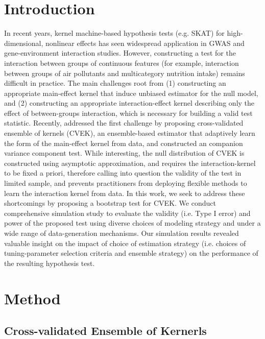 \documentclass[11pt]{article}
\begin{document}
\section{{\bf Introduction}}
In recent years, kernel machine-based hypothesis tests (e.g. SKAT) for high-dimensional, nonlinear effects has seen widespread application in GWAS and gene-environment interaction studies. However, constructing a test for the interaction between groups of continuous features (for example, interaction between groups of air pollutants and multicategory nutrition intake) remains difficult in practice. The main challenges root from (1) constructing an appropriate main-effect kernel that induce unbiased estimator for the null model, and (2) constructing an appropriate interaction-effect kernel describing only the effect of between-groups interaction, which is necessary for building a valid test statistic. Recently, \citep{liu_robust_2017} addressed the first challenge by proposing cross-validated ensemble of kernels (CVEK), an ensemble-based estimator that adaptively learn the form of the main-effect kernel from data, and constructed an companion variance component test. While interesting, the null distribution of CVEK is constructed using asymptotic approximation, and requires the interaction-kernel to be fixed a priori, therefore calling into question the validity of the test in limited sample, and prevents practitioners from deploying flexible methods to learn the interaction kernel from data. In this work, we seek to address these shortcomings by proposing a bootstrap test for CVEK. We conduct comprehensive simulation study to evaluate the validity (i.e. Type I error) and power of the proposed test using diverse choices of modeling strategy and under a wide range of data-generation mechanisms. Our simulation results revealed valuable insight on the impact of choice of estimation strategy (i.e. choices of tuning-parameter selection criteria and ensemble strategy) on the performance of the resulting hypothesis test.

\newpage
\section{{\bf Method}}
\subsection{\textbf{Cross-validated Ensemble of Kernerls}}
\setcounter{equation}{0}
\renewcommand{\theequation}{2.1.\arabic{equation}}
\end{document}
